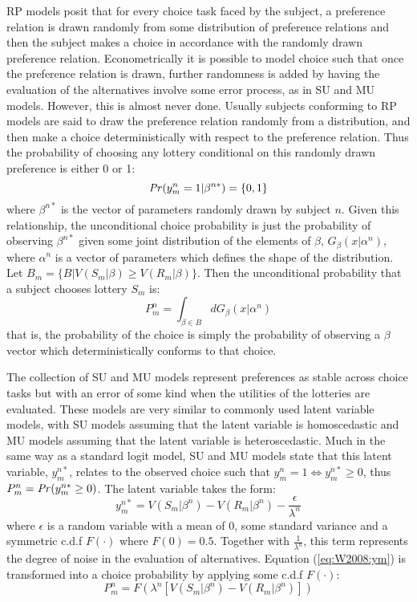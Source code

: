 \documentclass[../main.tex]{subfiles}
\begin{document}
RP models posit that for every choice task faced by the subject, a preference relation is drawn randomly from some distribution of preference relations and then the subject makes a choice in accordance with the randomly drawn preference relation.
Econometrically it is possible to model choice such that once the preference relation is drawn, further randomness is added by having the evaluation of the alternatives involve some error process, as in SU and MU models.
However, this is almost never done.
Usually subjects conforming to RP models are said to draw the preference relation randomly from a distribution, and then make a choice deterministically with respect to the preference relation.
Thus the probability of choosing any lottery conditional on this randomly drawn preference is either 0 or 1:
\begin{equation}
	{\ensuremath{\mathit{Pr}}}(y_m^n = 1 | \beta^{n*}) = \lbrace 0,1 \rbrace
\end{equation}
\noindent where $\beta^{n*}$ is the vector of parameters randomly drawn by subject $n$.
Given this relationship, the unconditional choice probability is just the probability of observing $\beta^{n*}$ given some joint distribution of the elements of $\beta$, $G_\beta(x|\alpha^n)$, where $\alpha^n$ is a vector of parameters which defines the shape of the distribution.
Let $B_m= \lbrace B | V(S_m | \beta) \geq V(R_m|\beta) \rbrace$.
Then the unconditional probability that a subject chooses lottery $S_m$ is:
\begin{equation}
	P_m^n = \int_{\beta \in B} dG_\beta(x | \alpha^n)
\end{equation}
\noindent that is, the probability of the choice is simply the probability of observing a $\beta$ vector which deterministically conforms to that choice.

The collection of SU and MU models represent preferences as stable across choice tasks but with an error of some kind when the utilities of the lotteries are evaluated.
These models are very similar to commonly used latent variable models, with SU models assuming that the latent variable is homoscedastic and MU models assuming that the latent variable is heteroscedastic.
Much in the same way as a standard logit model, SU and MU models state that this latent variable, $y_m^{n*}$, relates to the observed choice such that $y_m^n = 1 \Leftrightarrow y_m^{n*} \geq 0$, thus $P_m^n = {\mathit{Pr}}(y_m^{n*} \geq 0)$.
The latent variable takes the form:
\begin{equation}
	\label{eq:W2008:ym}
	y_m^{n*} = V(S_m | \beta^n) - V(R_m | \beta^n) - \frac{\epsilon}{\lambda^n}
\end{equation}
\noindent where $\epsilon$ is a random variable with a mean of 0, some standard variance and a symmetric c.d.f $F(\cdot)$ where $F(0) = 0.5$.
Together with $\frac{1}{\lambda^n}$, this term represents the degree of noise in the evaluation of alternatives.
Equation (\ref{eq:W2008:ym}) is transformed into a choice probability by applying some c.d.f $F(\cdot)$:
\begin{equation}
	\label{eq:W2008:Pm}
	P_m^n = F\left( \lambda^n [V(S_m | \beta^n) - V(R_m | \beta^n)] \right)
\end{equation}
\end{document}
